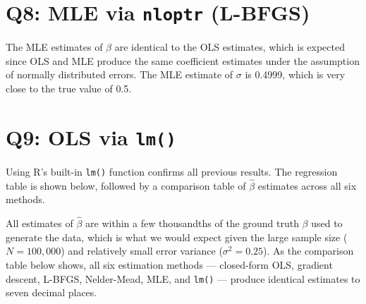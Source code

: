 \documentclass[12pt]{article}
\begin{document}
\section*{Q8: MLE via \texttt{nloptr} (L-BFGS)}
The MLE estimates of $\beta$ are identical to the OLS estimates, which is expected since OLS and MLE produce the same coefficient estimates under the assumption of normally distributed errors. The MLE estimate of $\sigma$ is 0.4999, which is very close to the true value of 0.5.

\section*{Q9: OLS via \texttt{lm()}}
Using R's built-in \texttt{lm()} function confirms all previous results. The regression table is shown below, followed by a comparison table of $\hat{\beta}$ estimates across all six methods.



All estimates of $\hat{\beta}$ are within a few thousandths of the ground truth $\beta$ used to generate the data, which is what we would expect given the large sample size ($N = 100{,}000$) and relatively small error variance ($\sigma^2 = 0.25$). As the comparison table below shows, all six estimation methods --- closed-form OLS, gradient descent, L-BFGS, Nelder-Mead, MLE, and \texttt{lm()} --- produce identical estimates to seven decimal places.


\end{document}
